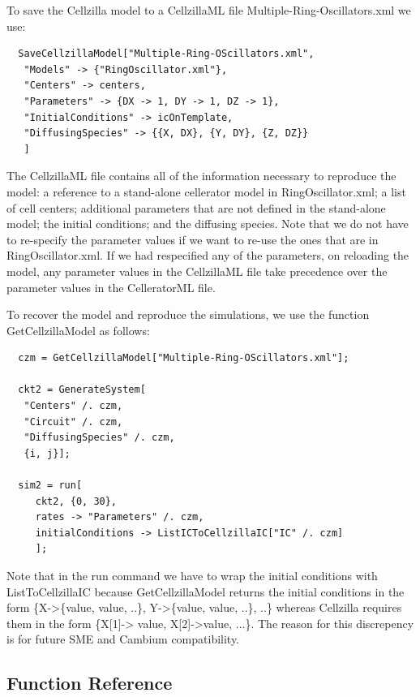 \documentclass[12pt,letterpaper]{article}
\begin{document}
To save the Cellzilla model to a CellzillaML file {\ttfamily Multiple-Ring-Oscillators.xml} we use:

\begin{verbatim}
  SaveCellzillaModel["Multiple-Ring-OScillators.xml", 
   "Models" -> {"RingOscillator.xml"},
   "Centers" -> centers,
   "Parameters" -> {DX -> 1, DY -> 1, DZ -> 1}, 
   "InitialConditions" -> icOnTemplate, 
   "DiffusingSpecies" -> {{X, DX}, {Y, DY}, {Z, DZ}}
   ] 
\end{verbatim}

The CellzillaML file contains all of the information necessary to reproduce the model: a reference to
a stand-alone cellerator model in {\ttfamily RingOscillator.xml}; a list of cell centers; additional parameters
that are not defined in the stand-alone model; the initial conditions; and the diffusing species. Note that we 
do not have to re-specify the parameter values if we want to re-use the ones that are in {\ttfamily RingOscillator.xml}. If we
had respecified any of the parameters, on reloading the model, any parameter values in the CellzillaML file take precedence
over the parameter values in the CelleratorML file. 

To recover the model and reproduce the simulations, we use the function {\ttfamily GetCellzillaModel} as follows: 

\begin{verbatim}
  czm = GetCellzillaModel["Multiple-Ring-OScillators.xml"];
  
  ckt2 = GenerateSystem[
   "Centers" /. czm,
   "Circuit" /. czm,
   "DiffusingSpecies" /. czm, 
   {i, j}];
   
  sim2 = run[
     ckt2, {0, 30},
     rates -> "Parameters" /. czm,
     initialConditions -> ListICToCellzillaIC["IC" /. czm]
     ];

\end{verbatim}

Note that in the {\ttfamily run} command we have to wrap the initial conditions with {\ttfamily ListToCellzillaIC} because {\ttfamily GetCellzillaModel} returns the initial conditions in the form {\ttfamily \{X->\{value, value, ..\}, Y->\{value, value, ..\}, ..\}} whereas Cellzilla requires them in the form {\ttfamily \{X[1]-> value, X[2]->value, ...\}}. The reason for this discrepency is for future SME and Cambium compatibility.

 

  
\subsection{Function Reference}
\end{document}
